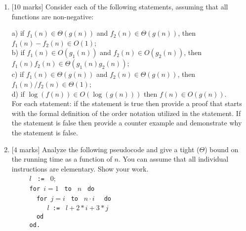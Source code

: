 \documentclass[12pt]{article}
\begin{document}
\begin{enumerate}
\item{[10 marks]}
Consider each of the following statements, assuming that all functions are non-negative: \\
\vspace{0.5cm}

\noindent
a) if $f_1(n) \in \Theta(g(n))$ and $f_2(n) \in \Theta(g(n))$, then
$f_1(n)-f_2(n) \in O(1)$;\\
b) if $f_1(n) \in O(g_1(n))$ and $f_2(n) \in O(g_2(n))$, then
$f_1(n)f_2(n) \in \Theta(g_1(n)g_2(n))$; \\
c) if $f_1(n) \in \Theta(g(n))$ and $f_2(n) \in \Theta(g(n))$, then
$f_1(n)/f_2(n) \in \Theta(1)$;\\
d) if $\log (f(n)) \in O(\log(g(n)))$
then $f(n) \in O(g(n))$.\\

For each statement: if the statement is true then provide a proof
that starts with the formal definition of the order notation
utilized in the statement. If the statement is false then provide a
counter example and  demonstrate why the statement is false.


\item{[4 marks]} Analyze the following pseudocode and give a tight
($\Theta$) bound on the running time
as a function of $n$. You can assume that all individual instructions
are elementary. Show your work. \\
\verb|     |$l$ \verb| := | 0;\\
\verb|     for |$i=1$ \verb| to | $ n $ \verb| do |\\
\verb|       for |$j=i$ \verb| to | $n \cdot i$ \verb|  do |\\
\verb|          |$l $\verb| := | $l+2*i+3*j$\\
\verb|       od  |\\
\verb|     od.|\\

\vspace{0.5cm}


\end{enumerate}
\end{document}
